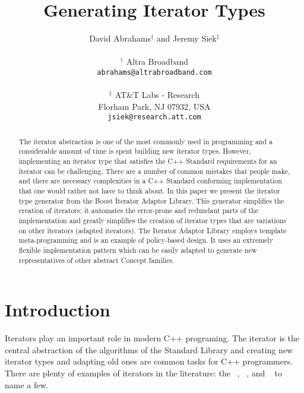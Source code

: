 \documentclass{netobjectdays}
\begin{document}
\title{Generating Iterator Types}

\author{David Abrahams$^\dag$ and Jeremy Siek$^\ddag$ \\
\\
$^\dag$ Altra Broadband \\
\texttt{abrahams@altrabroadband.com}\\
\\
$^\ddag$ AT\&T Labs - Research \\
Florham Park, NJ 07932, USA \\
\texttt{jsiek@research.att.com}
}

\maketitle


\begin{abstract}
The iterator abstraction is one of the most commonly used in
programming and a considerable amount of time is spent building new
iterator types. However, implementing an iterator type that satisfies
the C++ Standard requirements for an iterator can be
challenging. There are a number of common mistakes that people make,
and there are necessary complexities in a C++ Standard conforming
implementation that one would rather not have to think about. In this
paper we present the iterator type generator from the Boost Iterator
Adaptor Library. This generator simplifies the creation of iterators;
it automates the error-prone and redundant parts of the implementation
and greatly simplifies the creation of iterator types that are
variations on other iterators (adapted iterators). The Iterator
Adaptor Library employs template meta-programming and is an example of
policy-based design. It uses an extremely flexible implementation
pattern which can be easily adapted to generate new representatives of
other abstract Concept families.

\end{abstract}


\section{Introduction}


Iterators play an important role in modern C++ programing. The
iterator is the central abstraction of the algorithms of the Standard
Library and creating new iterator types and adapting old ones are
common tasks for C++ programmers. There are plenty of examples of
iterators in the literature: the
~\cite{austern99:_gener_progr_stl},
~\cite{koenig97:_rumin_cpp},
 and
~\cite{iso98:_cpp_final_draft_standard}
to name a few.
\end{document}

